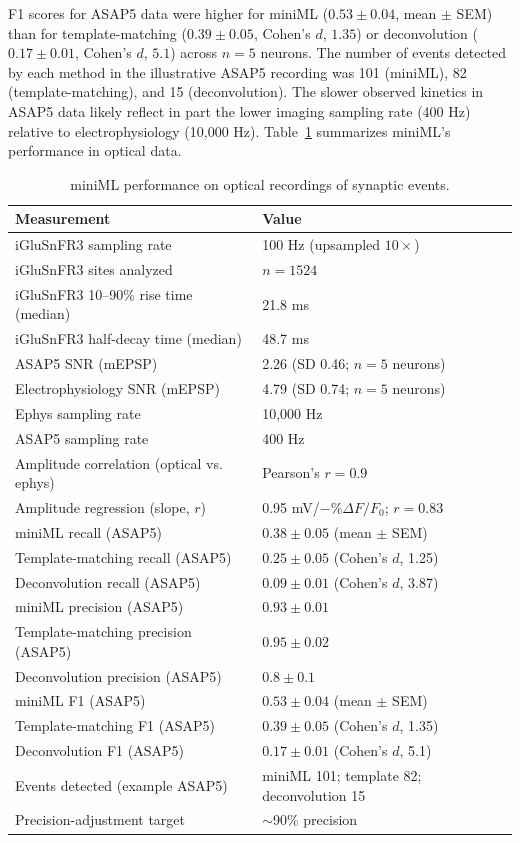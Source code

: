 \documentclass[9pt,lineno]{article}
\begin{document}
F1 scores for ASAP5 data were higher for miniML ($0.53 \pm 0.04$, mean $\pm$ SEM) than for template-matching ($0.39 \pm 0.05$, Cohen's $d$, $1.35$) or deconvolution ($0.17 \pm 0.01$, Cohen's $d$, $5.1$) across $n = 5$ neurons. The number of events detected by each method in the illustrative ASAP5 recording was 101 (miniML), 82 (template-matching), and 15 (deconvolution). The slower observed kinetics in ASAP5 data likely reflect in part the lower imaging sampling rate (400 Hz) relative to electrophysiology (10{,}000 Hz). Table~\ref{tab:optical} summarizes miniML's performance in optical data.

\begin{table}[ht]
\centering
\caption{miniML performance on optical recordings of synaptic events.}
\label{tab:optical}
\begin{tabular}{ll}
\toprule
Measurement & Value \\
\midrule
iGluSnFR3 sampling rate & 100 Hz (upsampled $10\times$) \\
iGluSnFR3 sites analyzed & $n = 1524$ \\
iGluSnFR3 10--90\% rise time (median) & 21.8 ms \\
iGluSnFR3 half-decay time (median) & 48.7 ms \\
ASAP5 SNR (mEPSP) & 2.26 (SD 0.46; $n = 5$ neurons) \\
Electrophysiology SNR (mEPSP) & 4.79 (SD 0.74; $n = 5$ neurons) \\
Ephys sampling rate & 10{,}000 Hz \\
ASAP5 sampling rate & 400 Hz \\
Amplitude correlation (optical vs. ephys) & Pearson's $r = 0.9$ \\
Amplitude regression (slope, $r$) & 0.95 mV/$-\%\Delta F/F_0$; $r = 0.83$ \\
miniML recall (ASAP5) & $0.38 \pm 0.05$ (mean $\pm$ SEM) \\
Template-matching recall (ASAP5) & $0.25 \pm 0.05$ (Cohen's $d$, 1.25) \\
Deconvolution recall (ASAP5) & $0.09 \pm 0.01$ (Cohen's $d$, 3.87) \\
miniML precision (ASAP5) & $0.93 \pm 0.01$ \\
Template-matching precision (ASAP5) & $0.95 \pm 0.02$ \\
Deconvolution precision (ASAP5) & $0.8 \pm 0.1$ \\
miniML F1 (ASAP5) & $0.53 \pm 0.04$ (mean $\pm$ SEM) \\
Template-matching F1 (ASAP5) & $0.39 \pm 0.05$ (Cohen's $d$, 1.35) \\
Deconvolution F1 (ASAP5) & $0.17 \pm 0.01$ (Cohen's $d$, 5.1) \\
Events detected (example ASAP5) & miniML 101; template 82; deconvolution 15 \\
Precision-adjustment target & $\sim$90\% precision \\
\bottomrule
\end{tabular}
\end{table}
\end{document}
